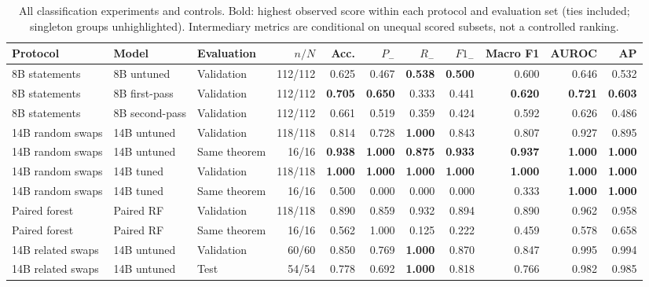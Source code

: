 \begin{table}[htbp]
\centering
\caption{All classification experiments and controls. Bold: highest observed score within each protocol and evaluation set (ties included; singleton groups unhighlighted). Intermediary metrics are conditional on unequal scored subsets, not a controlled ranking.}
\label{tab:main-metrics}
\small
\begin{adjustbox}{max width=\textwidth}
\begin{tabular}{lllrrrrrrrr}
\toprule
Protocol & Model & Evaluation & $n/N$ & Acc. & $P_-$ & $R_-$ & $F1_-$ & Macro F1 & AUROC & AP \\
\midrule
8B statements & 8B untuned & Validation & 112/112 & 0.625 & 0.467 & \textbf{0.538} & \textbf{0.500} & 0.600 & 0.646 & 0.532 \\
8B statements & 8B first-pass & Validation & 112/112 & \textbf{0.705} & \textbf{0.650} & 0.333 & 0.441 & \textbf{0.620} & \textbf{0.721} & \textbf{0.603} \\
8B statements & 8B second-pass & Validation & 112/112 & 0.661 & 0.519 & 0.359 & 0.424 & 0.592 & 0.626 & 0.486 \\
\midrule
14B random swaps & 14B untuned & Validation & 118/118 & 0.814 & 0.728 & \textbf{1.000} & 0.843 & 0.807 & 0.927 & 0.895 \\
14B random swaps & 14B untuned & Same theorem & 16/16 & \textbf{0.938} & \textbf{1.000} & \textbf{0.875} & \textbf{0.933} & \textbf{0.937} & \textbf{1.000} & \textbf{1.000} \\
14B random swaps & 14B tuned & Validation & 118/118 & \textbf{1.000} & \textbf{1.000} & \textbf{1.000} & \textbf{1.000} & \textbf{1.000} & \textbf{1.000} & \textbf{1.000} \\
14B random swaps & 14B tuned & Same theorem & 16/16 & 0.500 & 0.000 & 0.000 & 0.000 & 0.333 & \textbf{1.000} & \textbf{1.000} \\
\midrule
Paired forest & Paired RF & Validation & 118/118 & 0.890 & 0.859 & 0.932 & 0.894 & 0.890 & 0.962 & 0.958 \\
Paired forest & Paired RF & Same theorem & 16/16 & 0.562 & 1.000 & 0.125 & 0.222 & 0.459 & 0.578 & 0.658 \\
\midrule
14B related swaps & 14B untuned & Validation & 60/60 & 0.850 & 0.769 & \textbf{1.000} & 0.870 & 0.847 & 0.995 & 0.994 \\
14B related swaps & 14B untuned & Test & 54/54 & 0.778 & 0.692 & \textbf{1.000} & 0.818 & 0.766 & 0.982 & 0.985 \\

\end{tabular}
\end{adjustbox}
\end{table}
